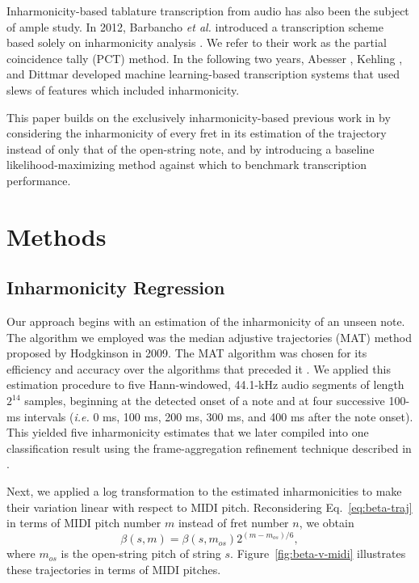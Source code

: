 \documentclass[convention,peer-reviewed]{aesconf}
\begin{document}
Inharmonicity-based tablature transcription from audio has also been the subject of ample study. In 2012, Barbancho \emph{et al.} introduced a transcription scheme based solely on inharmonicity analysis \citep{barbanchoi2012}. We refer to their work as the partial coincidence tally (PCT) method. In the following two years, Abesser \citep{abesser2012}, Kehling \citep{kehling2014}, and Dittmar \citep{dittmar2013} developed machine learning-based transcription systems that used slews of features which included inharmonicity.

This paper builds on the exclusively inharmonicity-based previous work in \citep{barbanchoi2012} by considering the inharmonicity of every fret in its estimation of the trajectory instead of only that of the open-string note, and by introducing a baseline likelihood-maximizing method against which to benchmark transcription performance.

\section{Methods}

\subsection{Inharmonicity Regression}
\label{sub:inharmonicity-regression}
Our approach begins with an estimation of the inharmonicity of an unseen note. The algorithm we employed was the median adjustive trajectories (MAT) method \citep{hodgkinson2009} proposed by Hodgkinson in 2009. The MAT algorithm was chosen for its efficiency and accuracy over the algorithms that preceded it \citep{hodgkinson2009}. We applied this estimation procedure to five Hann-windowed, 44.1-kHz audio segments of length $2^{14}$ samples, beginning at the detected onset of a note and at four successive 100-ms intervals (\emph{i.e.} 0 ms, 100 ms, 200 ms, 300 ms, and 400 ms after the note onset). This yielded five inharmonicity estimates that we later compiled into one classification result using the frame-aggregation refinement technique described in \citep{abesser2012}.

Next, we applied a log transformation to the estimated inharmonicities to make their variation linear with respect to MIDI pitch. Reconsidering Eq.~\eqref{eq:beta-traj} in terms of MIDI pitch number $m$ instead of fret number $n$, we obtain
\begin{equation}
\beta(s,m) = \beta(s,m_{os})2^{(m-m_{os})/6},
\end{equation}
where $m_{os}$ is the open-string pitch of string $s$. Figure~\ref{fig:beta-v-midi} illustrates these trajectories in terms of MIDI pitches.
\end{document}
